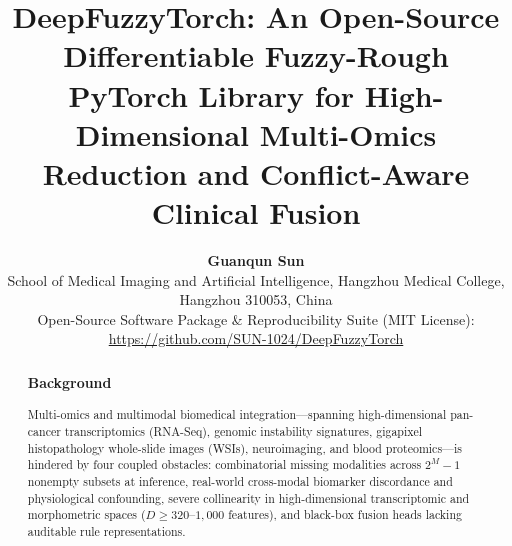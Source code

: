 \documentclass[10pt,twocolumn]{article}
\title{\vspace{-1.0em}%
\textbf{DeepFuzzyTorch: An Open-Source Differentiable Fuzzy-Rough PyTorch Library for
High-Dimensional Multi-Omics Reduction and Conflict-Aware Clinical Fusion}}
\author{
\textbf{Guanqun Sun}\\
\small School of Medical Imaging and Artificial Intelligence, Hangzhou Medical College,
Hangzhou 310053, China\\
\small Open-Source Software Package \& Reproducibility Suite (MIT License):
\url{https://github.com/SUN-1024/DeepFuzzyTorch}
}
\date{}
\begin{document}
\maketitle

\begin{abstract}
\subsubsection*{Background}
Multi-omics and multimodal biomedical integration---spanning high-dimensional pan-cancer
transcriptomics (RNA-Seq), genomic instability signatures, gigapixel histopathology whole-slide
images (WSIs), neuroimaging, and blood proteomics---is hindered by four coupled obstacles:
combinatorial missing modalities across $2^M-1$ nonempty subsets at inference, real-world
cross-modal biomarker discordance and physiological confounding, severe collinearity in
high-dimensional transcriptomic and morphometric spaces ($D \ge 320\text{--}1,000$ features),
and black-box fusion heads lacking auditable rule representations.


\end{abstract}
\end{document}
